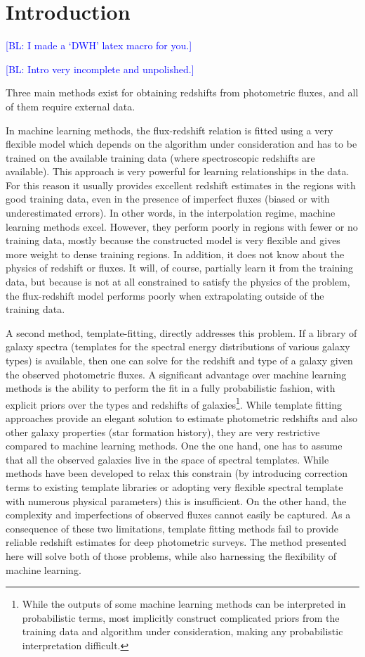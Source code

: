 \documentclass[aps,prd,showpacs,superscriptaddress,groupedaddress]{revtex4}  %
\newcommand{\bl}[1]{\textcolor{blue}{[BL: #1]}}
\begin{document}
  
\section{Introduction}

\bl{I made a `DWH' latex macro for you.}

\bl{Intro very incomplete and unpolished.}

Three main methods exist for obtaining redshifts from photometric fluxes, and all of them require external data.

In machine learning methods, the flux-redshift relation is fitted using a very flexible model which depends on the algorithm under consideration and has to be trained on the available training data (where spectroscopic redshifts are available).
This approach is very powerful for learning relationships in the data.
For this reason it usually provides excellent redshift estimates in the regions with good training data, even in the presence of imperfect fluxes (\ie biased or with underestimated errors).
In other words, in the interpolation regime, machine learning methods excel.
However, they perform poorly in regions with fewer or no training data, mostly because the constructed model is very flexible and gives more weight to dense training regions.
In addition, it does not know about the physics of redshift or fluxes. 
It will, of course, partially learn it from the training data, but because is not at all constrained to satisfy the physics of the problem, the flux-redshift model performs poorly when extrapolating outside of the training data.

A second method, template-fitting, directly addresses this problem. If a library of galaxy spectra (\ie templates for the spectral energy distributions of various galaxy types) is available, then one can solve for the redshift and type of a galaxy given the observed photometric fluxes.
A significant advantage over machine learning methods is the ability to perform the fit in a fully probabilistic fashion, with explicit priors over the types and redshifts of galaxies\footnote{While the outputs of some machine learning methods can be interpreted in probabilistic terms, most implicitly construct complicated priors from the training data and algorithm under consideration, making any probabilistic interpretation difficult.}.
While template fitting approaches provide an elegant solution to estimate photometric redshifts and also other galaxy properties (\eg star formation history), they are very restrictive compared to machine learning methods.
One the one hand, one has to assume that all the observed galaxies live in the space of spectral templates. 
While methods have been developed to relax this constrain (\eg by introducing correction terms to existing template libraries or adopting very flexible spectral template with numerous physical parameters) this is insufficient.
On the other hand, the complexity and imperfections of observed fluxes cannot easily be captured.
As a consequence of these two limitations, template fitting methods fail to provide reliable redshift estimates for deep photometric surveys.
The method presented here will solve both of those problems, while also harnessing the flexibility of machine learning.
\end{document}
